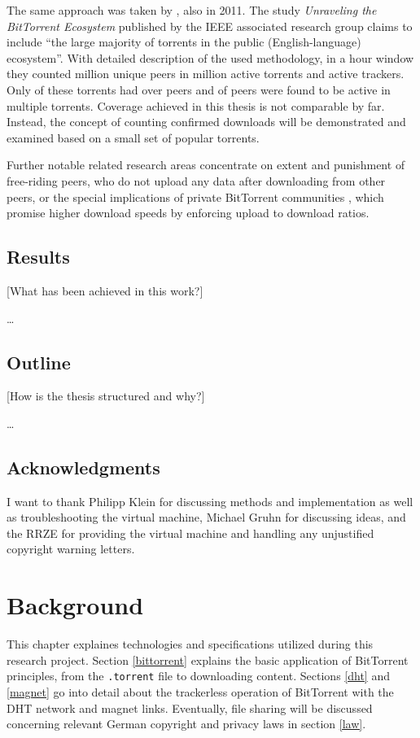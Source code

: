 \documentclass[10pt, a4paper, twoside, headsepline]{scrbook}
\renewcommand{\_}{\origunderscore\allowbreak}
\begin{document}
The same approach was taken by \textcite{zhang2011unraveling}, also in 2011. The study \emph{Unraveling the BitTorrent Ecosystem} published by the IEEE associated research group claims to include ``the large majority of torrents in the public (English-language) ecosystem''. With detailed description of the used methodology, in a  hour window they counted  million unique peers in  million active torrents and  active trackers. Only  of these torrents had over  peers and  of peers were found to be active in multiple torrents. Coverage achieved in this thesis is not comparable by far. Instead, the concept of counting confirmed downloads will be demonstrated and examined based on a small set of popular torrents.

Further notable related research areas concentrate on extent \cite{locher2006free} and punishment \cite{levin2008bittorrent, bhakuni} of free-riding peers, who do not upload any data after downloading from other peers, or the special implications of private BitTorrent communities \cite{meulpolder2010public}, which promise higher download speeds by enforcing upload to download ratios.

\section{Results}
[What has been achieved in this work?]

\dots

\section{Outline}
[How is the thesis structured and why?]

\dots

\section{Acknowledgments}
I want to thank Philipp Klein for discussing methods and implementation as well as troubleshooting the virtual machine, Michael Gruhn for discussing ideas, and the RRZE for providing the virtual machine and handling any unjustified copyright warning letters.

\chapter{Background}
This chapter explaines technologies and specifications utilized during this research project. Section \ref{bittorrent} explains the basic application of BitTorrent principles, from the \texttt{.torrent} file to downloading content. Sections \ref{dht} and \ref{magnet} go into detail about the trackerless operation of BitTorrent with the DHT network and magnet links. Eventually, file sharing will be discussed concerning relevant German copyright and privacy laws in section \ref{law}.
\end{document}
